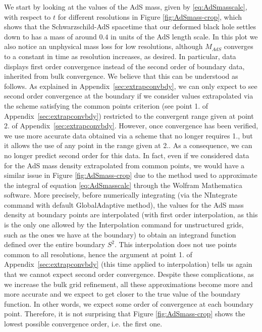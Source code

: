 \documentclass[a4paper,11pt]{article}
\numberwithin{equation}{section}
\begin{document}
We start by looking at the values of the AdS mass, given by \eqref{eq:AdSmasscalc}, with respect to $t$ for different resolutions in Figure \ref{fig:AdSmass-crop}, which shows that the Schwarzschild-AdS spacetime that our deformed black hole settles down to has a mass of around $0.4$ in units of the AdS length scale. In this plot we also notice an unphysical mass loss for low resolutions, although $M_{AdS}$ converges to a constant in time as resolution increases, as desired. In particular, data displays first order convergence instead of the second order of boundary data, inherited from bulk convergence. We believe that this can be understood as follows. As explained in Appendix~\ref{sec:extrapconvbdy}, we can only expect to see second order convergence at the boundary if we consider values extrapolated via the scheme satisfying the common points criterion (see point 1. of Appendix~\ref{sec:extrapconvbdy}) restricted to the convergent range given at point 2. of Appendix~\ref{sec:extrapconvbdy}. However, once convergence has been verified, we use more accurate data obtained via a scheme that no longer requires 1., but it allows the use of any point in the range given at 2.. As a consequence, we can no longer predict second order for this data. In fact, even if we considered data for the AdS mass density extrapolated from common points, we would have a similar issue in Figure \ref{fig:AdSmass-crop} due to the method used to approximate the integral of equation \eqref{eq:AdSmasscalc} through the Wolfram Mathematica software. More precisely, before numerically integrating (via the NIntegrate command with default GlobalAdaptive method), the values for the AdS mass density at boundary points are interpolated (with first order interpolation, as this is the only one allowed by the Interpolation command for unstructured grids, such as the ones we have at the boundary) to obtain an integrand function defined over the entire boundary $S^2$. This interpolation does not use points common to all resolutions, hence the argument at point 1. of Appendix~\ref{sec:extrapconvbdy} (this time applied to interpolation) tells us again that we cannot expect second order convergence. Despite these complications, as we increase the bulk grid refinement, all these approximations become more and more accurate and we expect to get closer to the true value of the boundary function. In other words, we expect some order of convergence at each boundary point. Therefore, it is not surprising that Figure \ref{fig:AdSmass-crop} shows the lowest possible convergence order, i.e. the first one.
\end{document}
